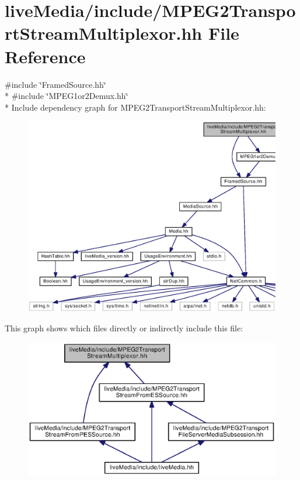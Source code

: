 \section{live\+Media/include/\+M\+P\+E\+G2\+Transport\+Stream\+Multiplexor.hh File Reference}
\label{MPEG2TransportStreamMultiplexor_8hh}
{\ttfamily \#include \char`\"{}Framed\+Source.\+hh\char`\"{}}\\*
{\ttfamily \#include \char`\"{}M\+P\+E\+G1or2\+Demux.\+hh\char`\"{}}\\*
Include dependency graph for M\+P\+E\+G2\+Transport\+Stream\+Multiplexor.\+hh\+:
\nopagebreak
\begin{figure}[H]
\begin{center}
\leavevmode
\includegraphics[width=350pt]{MPEG2TransportStreamMultiplexor_8hh__incl}
\end{center}
\end{figure}
This graph shows which files directly or indirectly include this file\+:
\nopagebreak
\begin{figure}[H]
\begin{center}
\leavevmode
\includegraphics[width=350pt]{MPEG2TransportStreamMultiplexor_8hh__dep__incl}
\end{center}
\end{figure}
